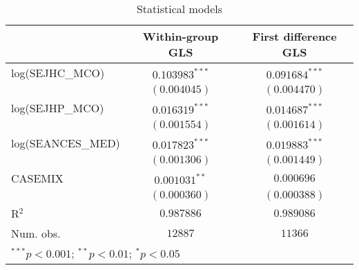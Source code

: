 
\begin{table}
\begin{center}
\begin{tabular}{l c c}
\hline
 & Within-group GLS & First difference GLS \\
\hline
log(SEJHC\_MCO)   & $0.103983^{***}$ & $0.091684^{***}$ \\
                  & $(0.004045)$     & $(0.004470)$     \\
log(SEJHP\_MCO)   & $0.016319^{***}$ & $0.014687^{***}$ \\
                  & $(0.001554)$     & $(0.001614)$     \\
log(SEANCES\_MED) & $0.017823^{***}$ & $0.019883^{***}$ \\
                  & $(0.001306)$     & $(0.001449)$     \\
CASEMIX           & $0.001031^{**}$  & $0.000696$       \\
                  & $(0.000360)$     & $(0.000388)$     \\
\hline
R$^2$             & $0.987886$       & $0.989086$       \\
Num. obs.         & $12887$          & $11366$          \\
\hline
\multicolumn{3}{l}{\scriptsize{$^{***}p<0.001$; $^{**}p<0.01$; $^{*}p<0.05$}}
\end{tabular}
\caption{Statistical models}
\label{table:coefficients}
\end{center}
\end{table}
